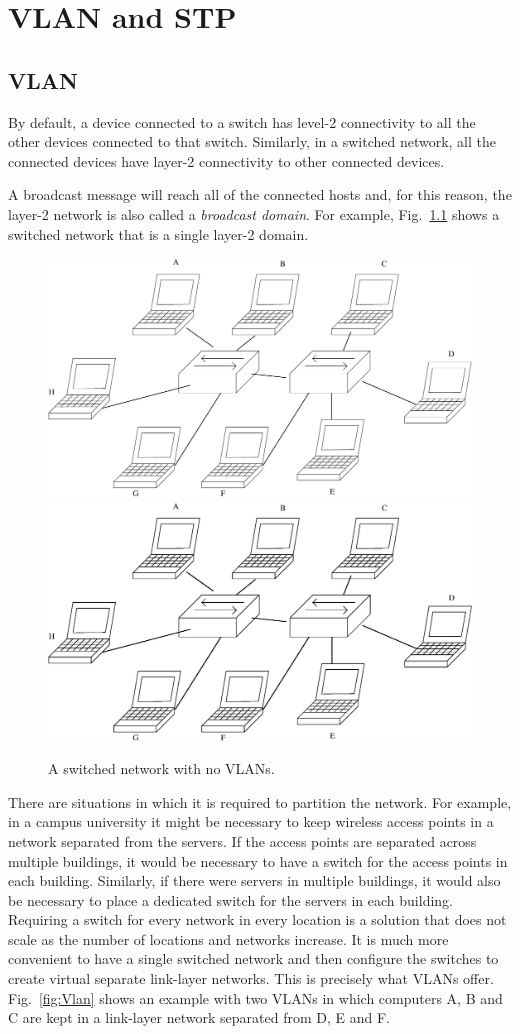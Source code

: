 \chapter{VLAN and STP}

\section{VLAN}
By default, a device connected to a switch has level-2 connectivity to all the other devices connected to that switch.
Similarly, in a switched network, all the connected devices have layer-2 connectivity to other connected devices.

A broadcast message will reach all of the connected hosts and, for this reason, the layer-2 network is also called a \emph{broadcast domain}.
For example, Fig.~\ref{fig:No_vlan} shows a switched network that is a single layer-2 domain.

\begin{figure}
\centering
\ifpdf
\includegraphics[width=0.5\linewidth]{Figures/No_vlan.pdf}
\else
\includegraphics[width=0.5\linewidth]{Figures/No_vlan.eps}
\fi
\caption{A switched network with no VLANs.}
\label{fig:No_vlan}
\end{figure}

There are situations in which it is required to partition the network.
For example, in a campus university it might be necessary to keep wireless access points in a network separated from the servers.
If the access points are separated across multiple buildings, it would be necessary to have a switch for the access points in each building.
Similarly, if there were servers in multiple buildings, it would also be necessary to place a dedicated switch for the servers in each building.
Requiring a switch for every network in every location is a solution that does not scale as the number of locations and networks increase.
It is much more convenient to have a single switched network and then configure the switches to create virtual separate link-layer networks.
This is precisely what VLANs offer.
Fig.~\ref{fig:Vlan} shows an example with two VLANs in which computers A, B and C are kept in a link-layer network separated from D, E and F.


